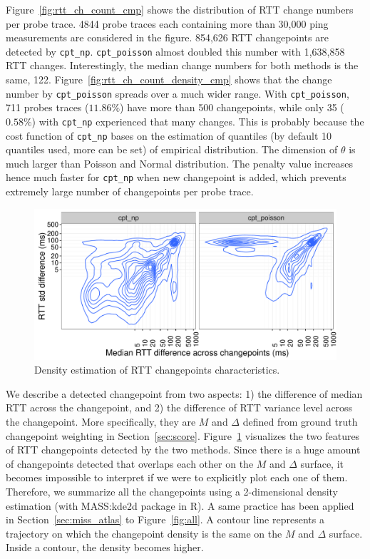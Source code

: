 Figure~\ref{fig:rtt_ch_count_cmp} shows the distribution of RTT change numbers per probe trace. 
4844 probe traces each containing more than 30,000 ping measurements are considered in the figure.
854,626 RTT changepoints are detected by \texttt{cpt\_np}.
\texttt{cpt\_poisson} almost doubled this number with 1,638,858 RTT changes.
Interestingly, the median change numbers for both methods is the same, 122.
Figure~\ref{fig:rtt_ch_count_density_cmp} shows that the change number by \texttt{cpt\_poisson} spreads over a much wider range.
With \texttt{cpt\_poisson}, 711 probes traces ($11.86\%$) have more than 500 changepoints, while only 35 ($0.58\%$) with \texttt{cpt\_np} experienced that many changes.
This is probably because the cost function of \texttt{cpt\_np} bases on the estimation of quantiles (by default 10 quantiles used, more can be set) of empirical distribution. The dimension of $\theta$ is much larger than Poisson and Normal distribution. The penalty value increases hence much faster for \texttt{cpt\_np} when new changepoint is added, which prevents extremely large number of changepoints per probe trace.

\begin{figure}[!thb]
\centering
\includegraphics[width=.96\textwidth]{gfx/chap4/rtt_ch_chara_cmp.pdf}
\caption{Density estimation of RTT changepoints characteristics.}
\label{fig:rtt_chara_cmp}
\end{figure}
We describe a detected changepoint from two aspects: 1) the difference of median RTT across the changepoint, and 2) the difference of RTT variance level across the changepoint.
More specifically, they are $M$ and $\Delta$ defined from ground truth changepoint weighting in Section~\ref{sec:score}.
Figure~\ref{fig:rtt_chara_cmp} visualizes the two features of RTT changepoints detected by the two methods.
Since there is a huge amount of changepoints detected that overlaps each other on the $M$ and $\Delta$ surface,
it becomes impossible to interpret if we were to explicitly plot each one of them.
Therefore, we summarize all the changepoints using a 2-dimensional density estimation (with MASS:kde2d package in R).
A same practice has been applied in Section~\ref{sec:miss_atlas} to Figure~\ref{fig:all}.
A contour line represents a trajectory on which the changepoint density is the same on the $M$ and $\Delta$ surface.
Inside a contour, the density becomes higher.

